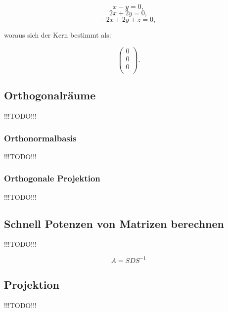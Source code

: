 \documentclass{scrartcl}
\newcommand{\TODO}{%
{\Huge\textcolor{HeavyRed}{\danger !!!TODO!!! \danger}}%
}
\begin{document}
\begin{equation}
	x - y = 0,
\end{equation}
\begin{equation}
	2x + 2y = 0,
\end{equation}
\begin{equation}
	-2x + 2y + z = 0,
\end{equation}

woraus sich der Kern bestimmt als:

\begin{equation}
	\begin{pmatrix*}
		0 \\
		0 \\
		0 \\
	\end{pmatrix*}.
\end{equation}


\subsection{Orthogonalräume}

\TODO

\subsubsection{Orthonormalbasis}

\TODO

\subsubsection{Orthogonale Projektion}

\TODO

\subsection{Schnell Potenzen von Matrizen berechnen}

\TODO

\begin{equation}
	A = SDS^{-1}
\end{equation}

\subsection{Projektion}

\TODO
\end{document}
